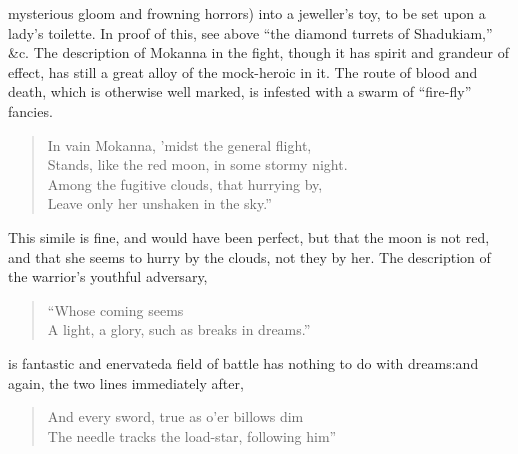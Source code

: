 mysterious gloom and frowning horrors) into a jeweller's toy, to be set
upon a lady's toilette. In proof of this, see above ``the diamond turrets
of Shadukiam,'' \&c. The description of Mokanna in the fight, though
it has spirit and grandeur of effect, has still a great alloy of the
mock-heroic in it. The route of blood and death, which is otherwise well
marked, is infested with a swarm of ``fire-fly'' fancies.
\begin{verse}
  In vain Mokanna, 'midst the general flight,\\
  Stands, like the red moon, in some stormy night.\\
  Among the fugitive clouds, that hurrying by,\\
  Leave only her unshaken in the sky.''
\end{verse}
This simile is fine, and would have been perfect, but that the moon is
not red, and that she seems to hurry by the clouds, not they by her. The
description of the warrior's youthful adversary,
\begin{verse}
 ``Whose coming seems\\
  A light, a glory, such as breaks in dreams.''\textemdash 
\end{verse}
is fantastic and enervated\textendash a field of battle has
nothing to do with dreams:\textendash and again, the two lines
immediately after,
\begin{verse}
  And every sword, true as o'er billows dim\\
  The needle tracks the load-star, following him''\textemdash 
\end{verse}

